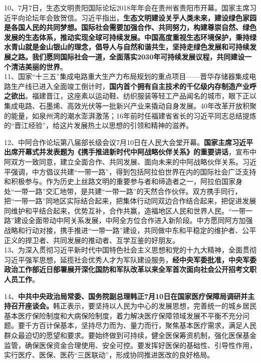 10、7月7日，生态文明贵阳国际论坛2018年年会在贵州省贵阳市开幕。国家主席习近平向论坛年会致贺信。习近平指出，{\textbf{生态文明建设关乎人类未来，建设绿色家园是各国人民的共同梦想。国际社会需要加强合作、共同努力，构建尊崇自然、绿色发展的生态体系，推动实现全球可持续发展。中国高度重视生态环境保护，秉持绿水青山就是金山银山的理念，倡导人与自然和谐共生，坚持走绿色发展和可持续发展之路。我们愿同国际社会一道，全面落实2030年可持续发展议程，共同建设一个清洁美丽的世界}}。\\

11、国家``十三五''集成电路重大生产力布局规划的重点项目------晋华存储器集成电路生产线已进入全面竣工倒计时，{\textbf{国内首个拥有自主技术的千亿级内存制造产业呼之欲出}}。福建晋江，这座素以运动鞋、纺织服装等轻工产品闻名的城市，眼下正以集成电路、石墨烯、高效光伏等一批新兴产业来撬动自身发展。40年改革开放积聚的能量，如泉州湾的潮水澎湃激荡；16年前时任福建省省长的习近平同志总结提炼的``晋江经验''，给这片发展热土以思想的引领和精神的滋养。

12、中阿合作论坛第八届部长级会议7月10日在人民大会堂开幕。{\textbf{国家主席习近平出席开幕式并发表题为《携手推进新时代中阿战略伙伴关系》的重要讲话}}，宣布中阿双方一致同意，建立全面合作、共同发展、面向未来的中阿战略伙伴关系。习近平强调，中方倡议共建``一带一路''，得到包括阿拉伯世界在内的国际社会广泛支持和积极参与。作为历史上丝路文明的重要参与者和缔造者之一，阿拉伯国家身处``一带一路''交汇地带，是共建``一带一路''的天然合作伙伴。双方携手同行，把``一带一路''同地区实际结合起来，把集体行动同双边合作结合起来，把促进发展同维护和平结合起来，优势互补，合作共赢，造福地区人民和世界人民。``一带一路''建设全面带动中阿关系发展，中阿全方位合作进入新阶段。中方愿同阿方加强战略和行动对接，携手推进``一带一路''建设，共同做中东和平稳定的维护者、公平正义的捍卫者、共同发展的推动者、互学互鉴的好朋友。\\

13、为深入贯彻习近平新时代中国特色社会主义思想和党的十九大精神，全面贯彻习近平强军思想，延揽社会优秀人才为军队建设服务，{\textbf{经中央军委批准，中央军委政治工作部近日部署展开深化国防和军队改革以来全军首次面向社会公开招考文职人员工作}}。

14、{\textbf{中共中央政治局常委、国务院副总理韩正7月10日在国家医疗保障局调研并主持召开座谈会。}}韩正表示，要坚持以人民为中心的发展思想，完善统一的城乡居民基本医疗保险制度和大病保险制度，着力解决医疗保障领域发展不平衡不充分问题。要千方百计保基本，坚持尽力而为、量力而行，聚焦基本医疗需求，满足人民群众最迫切的愿望和要求。要始终做到可持续，健全医保筹资机制，强化医保基金监管，确保医保资金合理使用、安全可控。要发挥好医保的基础性、引导性作用，实行医疗、医保、医药``三医联动''，形成协同推进医改的良好格局。

